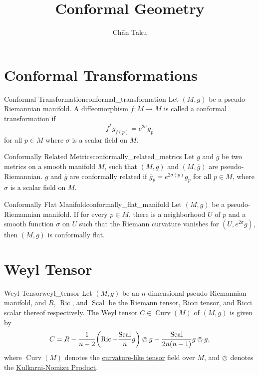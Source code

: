 \documentclass{article}
\title{Conformal Geometry}
\author{Ch\=an Taku}
\begin{document}
\maketitle

\section{Conformal Transformations}

\begin{definition}{Conformal Transformation}{conformal_transformation}
    Let $(M,g)$ be a pseudo-Riemannian manifold.
    A diffeomorphism $f: M\rightarrow M$ is called a conformal transformation if
    \[ f^* g_{f(p)} = e^{2\sigma} g_p \]
    for all $p\in M$ where $\sigma$ is a scalar field on $M$.
\end{definition}

\begin{definition}{Conformally Related Metrics}{conformally_related_metrics}
    Let $g$ and $\overline{g}$ be two metrics on a smooth manifold $M$, such that $(M,g)$ and $(M,\overline{g})$ are pseudo-Riemannian.
    $g$ and $\overline{g}$ are conformally related if
    $\overline{g}_p = e^{2\sigma(p)} g_p$
    for all $p\in M$, where $\sigma$ is a scalar field on $M$.
\end{definition}

\begin{definition}{Conformally Flat Manifold}{conformally_flat_manifold}
    Let $(M,g)$ be a pseudo-Riemannian manifold.
    If for every $p\in M$, there is a neighborhood $U$ of $p$ and a smooth function $\sigma$ on $U$ such that the Riemann curvature vanishes for $(U, e^{2\sigma} g)$,
    then $(M,g)$ is conformally flat.
\end{definition}

\section{Weyl Tensor}

\begin{definition}{Weyl Tensor}{weyl_tensor}
    Let $(M,g)$ be an $n$-dimensional pseudo-Riemannian manifold,
    and $R$, $\operatorname{Ric}$, and $\operatorname{Scal}$ be the Riemann tensor, Ricci tensor, and Ricci scalar thereof respectively.
    The Weyl tensor $C\in \operatorname{Curv}(M)$ of $(M,g)$ is given by
    \[ C = R - \frac{1}{n-2}\qty(\operatorname{Ric} - \frac{\operatorname{Scal}}{n}g) \owedge g - \frac{\operatorname{Scal}}{2n(n-1)} g\owedge g, \]
    where $\operatorname{Curv}(M)$ denotes the \hyperref[Riemannian-def:curvature_like_tensor]{curvature-like tensor} field over $M$,
    and $\owedge$ denotes the \hyperref[Riemannian-def:kulkarni_nomizu_product]{Kulkarni-Nomizu Product}.
\end{definition}
\end{document}
